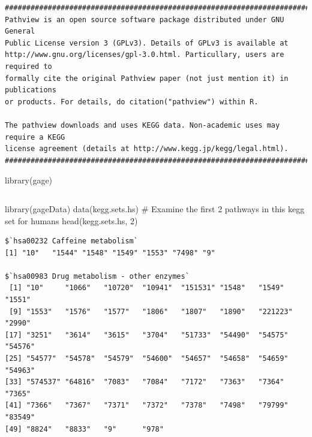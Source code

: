 \documentclass[
  letterpaper,
  DIV=11,
  numbers=noendperiod]{scrartcl}
\newenvironment{Shaded}{\begin{snugshade}}{\end{snugshade}}
\newcommand{\CommentTok}[1]{\textcolor[rgb]{0.37,0.37,0.37}{#1}}
\newcommand{\DecValTok}[1]{\textcolor[rgb]{0.68,0.00,0.00}{#1}}
\newcommand{\FunctionTok}[1]{\textcolor[rgb]{0.28,0.35,0.67}{#1}}
\newcommand{\NormalTok}[1]{\textcolor[rgb]{0.00,0.23,0.31}{#1}}
\begin{document}
\begin{verbatim}
##############################################################################
Pathview is an open source software package distributed under GNU General
Public License version 3 (GPLv3). Details of GPLv3 is available at
http://www.gnu.org/licenses/gpl-3.0.html. Particullary, users are required to
formally cite the original Pathview paper (not just mention it) in publications
or products. For details, do citation("pathview") within R.

The pathview downloads and uses KEGG data. Non-academic uses may require a KEGG
license agreement (details at http://www.kegg.jp/kegg/legal.html).
##############################################################################
\end{verbatim}

\begin{Shaded}
\begin{Highlighting}[]
   \FunctionTok{library}\NormalTok{(gage)}
\end{Highlighting}
\end{Shaded}

\begin{verbatim}
\end{verbatim}

\begin{Shaded}
\begin{Highlighting}[]
   \FunctionTok{library}\NormalTok{(gageData)}
   \FunctionTok{data}\NormalTok{(kegg.sets.hs)}
   \CommentTok{\# Examine the first 2 pathways in this kegg set for humans}
   \FunctionTok{head}\NormalTok{(kegg.sets.hs, }\DecValTok{2}\NormalTok{)}
\end{Highlighting}
\end{Shaded}

\begin{verbatim}
$`hsa00232 Caffeine metabolism`
[1] "10"   "1544" "1548" "1549" "1553" "7498" "9"   

$`hsa00983 Drug metabolism - other enzymes`
 [1] "10"     "1066"   "10720"  "10941"  "151531" "1548"   "1549"   "1551"  
 [9] "1553"   "1576"   "1577"   "1806"   "1807"   "1890"   "221223" "2990"  
[17] "3251"   "3614"   "3615"   "3704"   "51733"  "54490"  "54575"  "54576" 
[25] "54577"  "54578"  "54579"  "54600"  "54657"  "54658"  "54659"  "54963" 
[33] "574537" "64816"  "7083"   "7084"   "7172"   "7363"   "7364"   "7365"  
[41] "7366"   "7367"   "7371"   "7372"   "7378"   "7498"   "79799"  "83549" 
[49] "8824"   "8833"   "9"      "978"   
\end{verbatim}
\end{document}
